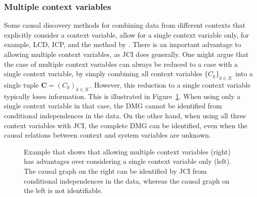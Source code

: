 \documentclass[twoside,11pt]{article}
\newcommand\B[1]{\bm{#1}}
\newcommand\C[1]{\mathcal{#1}}
\begin{document}
\subsubsection{Multiple context variables}
Some causal discovery methods for combining data from different contexts that explicitly consider a context variable,
allow for a single context variable only, for example, LCD, ICP, and the method by \citet{Zhang++_IJCAI17}. 
There is an important advantage to allowing multiple context variables, as JCI does generally.
One might argue that the case of multiple context variables can always be reduced to a case with a single context variable, by simply combining all context variables $\{C_k\}_{k\in\C{K}}$ into a single tuple $\B{C} = (C_k)_{k\in\C{K}}$. 
However, this reduction to a single context variable typically loses information.
This is illustrated in Figure~\ref{fig:multiple_contexts_advantage}.
When using only a single context variable in that case, the DMG cannot be identified from conditional independences in the data.
On the other hand, when using all three context variables with JCI, the complete DMG can be identified, even when the causal relations between context and system variables are unknown.

\begin{figure}
  \centering
\caption{Example that shows that allowing multiple context variables (right) has advantages over considering a single context variable only (left). The causal graph on the right can be identified by JCI from conditional independences in the data, whereas the causal graph on the left is not identifiable.\label{fig:multiple_contexts_advantage}}
\end{figure}
\end{document}
